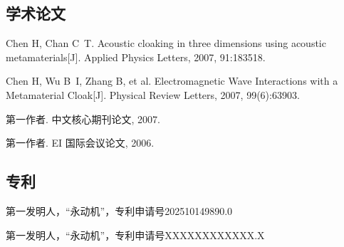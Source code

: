 
\begin{achievements}

\subsection*{学术论文}

\begin{bibliolist}{00}
  \item Chen H, Chan C~T. Acoustic cloaking in three dimensions using acoustic metamaterials[J]. Applied Physics Letters, 2007, 91:183518.
  \item Chen H, Wu B~I, Zhang B, et al. Electromagnetic Wave Interactions with a Metamaterial Cloak[J]. Physical Review Letters, 2007, 99(6):63903.
\end{bibliolist}

\begin{bibliolist*}{00}
  \item 第一作者. 中文核心期刊论文, 2007.
  \item 第一作者. EI 国际会议论文, 2006.
\end{bibliolist*}

\subsection*{专利}

\begin{bibliolist}{00}
  \item 第一发明人，“永动机”，专利申请号202510149890.0
\end{bibliolist}

\begin{bibliolist*}{00}
  \item 第一发明人，“永动机”，专利申请号XXXXXXXXXXXX.X
\end{bibliolist*}

\end{achievements}
